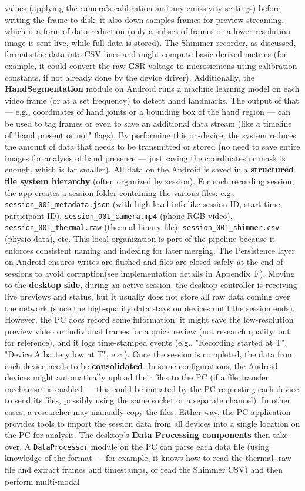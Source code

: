 values (applying the camera's calibration and any emissivity settings) before writing the frame to disk; it also down-samples frames for preview streaming, which is a form of data reduction (only a subset of frames or a lower resolution image is sent live, while full data is stored). The Shimmer recorder, as discussed, formats the data into CSV lines and might compute basic derived metrics (for example, it could convert the raw GSR voltage to microsiemens using calibration constants, if not already done by the device driver). Additionally, the \textbf{HandSegmentation} module on Android runs a machine learning model on each video frame (or at a set frequency) to detect hand landmarks. The output of that --- e.g., coordinates of hand joints or a bounding box of the hand region --- can be used to tag frames or even to save an additional data stream (like a timeline of "hand present or not" flags). By performing this on-device, the system reduces the amount of data that needs to be transmitted or stored (no need to save entire images for analysis of hand presence --- just saving the coordinates or mask is enough, which is far smaller). All data on the Android is saved in a \textbf{structured file system hierarchy} (often organized by session). For each recording session, the app creates a session folder containing the various files: e.g., \texttt{session_001_metadata.json} (with high-level info like session ID, start time, participant ID), \texttt{session_001_camera.mp4} (phone RGB video), \texttt{session_001_thermal.raw} (thermal binary file), \texttt{session_001_shimmer.csv} (physio data), etc. This local organization is part of the pipeline because it enforces consistent naming and indexing for later merging. The Persistence layer on Android ensures writes are flushed and files are closed safely at the end of sessions to avoid corruption(see implementation details in Appendix~F). Moving to the \textbf{desktop side}, during an active session, the desktop controller is receiving live previews and status, but it usually does not store all raw data coming over the network (since the high-quality data stays on devices until the session ends). However, the PC does record some information: it might save the low-resolution preview video or individual frames for a quick review (not research quality, but for reference), and it logs time-stamped events (e.g., "Recording started at T", "Device A battery low at T", etc.). Once the session is completed, the data from each device needs to be \textbf{consolidated}. In some configurations, the Android devices might automatically upload their files to the PC (if a file transfer mechanism is enabled --- this could be initiated by the PC requesting each device to send its files, possibly using the same socket or a separate channel). In other cases, a researcher may manually copy the files. Either way, the PC application provides tools to import the session data from all devices into a single location on the PC for analysis. The desktop's \textbf{Data Processing components} then take over. A \texttt{DataProcessor} module on the PC can parse each data file (using knowledge of the format --- for example, it knows how to read the thermal .raw file and extract frames and timestamps, or read the Shimmer CSV) and then perform multi-modal 